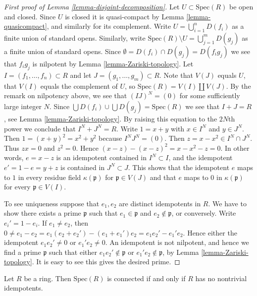\begin{proof}[First proof of Lemma \ref{lemma-disjoint-decomposition}]
Let $U \subset \text{Spec}(R)$ be open and closed.
Since $U$ is closed it is quasi-compact by
Lemma \ref{lemma-quasicompact}, and similarly for
its complement.
Write $U = \bigcup_{i = 1}^n D(f_i)$ as a finite union of standard opens.
Similarly, write $\text{Spec}(R) \setminus U = \bigcup_{j = 1}^m D(g_j)$
as a finite union of standard opens. Since $\emptyset =
D(f_i) \cap D(g_j) = D(f_i g_j)$ we see that $f_i g_j$ is
nilpotent by Lemma \ref{lemma-Zariski-topology}.
Let $I = (f_1, \ldots, f_n) \subset R$ and let
$J = (g_1, \ldots, g_m) \subset R$.
Note that $V(J)$ equals $U$, that $V(I)$
equals the complement of $U$, so $\text{Spec}(R) = V(I) \coprod V(J)$.
By the remark on nilpotency above,
we see that $(IJ)^N = (0)$ for some sufficiently large integer $N$.
Since $\bigcup D(f_i) \cup \bigcup D(g_j) = \text{Spec}(R)$
we see that $I + J = R$, see Lemma \ref{lemma-Zariski-topology}.
By raising this equation to the $2N$th power we conclude that
$I^N + J^N = R$. Write $1 = x + y$ with $x \in I^N$ and $y \in J^N$.
Then $1 = (x + y)^2 = x^2 + y^2$ because $I^N J^N = (0)$.
Then $z = x - x^2 \in I^N \cap J^N$. Thus $zx = 0$ and $z^2 = 0$.
Hence $(x - z) - (x - z)^2 = x - x^2 - z = 0$.
In other words, $e = x - z$ is an idempotent contained in
$I^N \subset I$, and the idempotent $e' = 1 - e = y + z$
is contained in $J^N \subset J$. This shows that the
idempotent $e$ maps to $1$ in every residue field
$\kappa(\mathfrak p)$ for $\mathfrak p \in V(J)$ and
that $e$ maps to $0$ in $\kappa(\mathfrak p)$
for every $\mathfrak p \in V(I)$.

\medskip\noindent
To see uniqueness suppose that $e_1, e_2$ are
distinct idempotents in $R$. We have to show there
exists a prime $\mathfrak p$ such that $e_1 \in \mathfrak p$
and $e_2 \not \in \mathfrak p$, or conversely.
Write $e_i' = 1 - e_i$. If $e_1 \not = e_2$, then
$0 \not = e_1 - e_2  = e_1(e_2 + e_2') - (e_1 + e_1')e_2
= e_1 e_2' - e_1' e_2$. Hence either the idempotent
$e_1 e_2' \not = 0$ or $e_1' e_2 \not = 0$. An idempotent
is not nilpotent, and hence we find a prime
$\mathfrak p$ such that either $e_1e_2' \not \in \mathfrak p$
or $e_1'e_2 \not \in \mathfrak p$, by Lemma \ref{lemma-Zariski-topology}.
It is easy to see this gives the desired prime.
\end{proof}

\begin{lemma}
\label{lemma-characterize-spec-connected}
Let $R$ be a ring. Then $\text{Spec}(R)$ is
connected if and only if $R$ has no nontrivial
idempotents.
\end{lemma}

